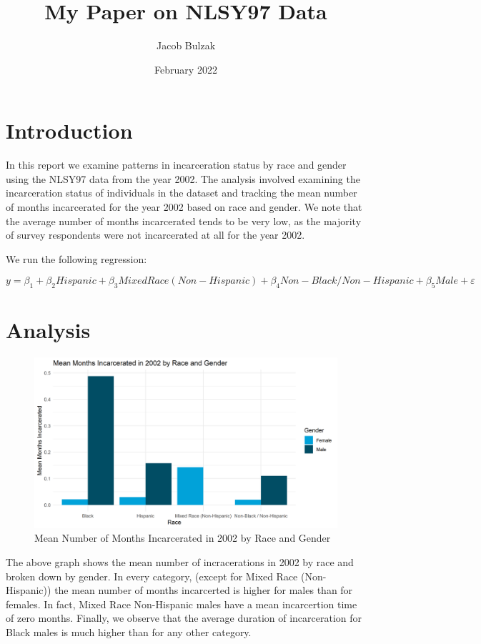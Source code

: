 \documentclass{article}
\author{Jacob Bulzak}
\title{My Paper on NLSY97 Data}
\date{February 2022}
\begin{document}
\maketitle

\section{Introduction}

In this report we examine patterns in incarceration status by race and gender using the NLSY97 data from the year 2002. The analysis involved examining the incarceration status of  individuals in the dataset and tracking the mean number of months incarcerated for the year 2002 based on race and gender. We note that the average number of months incarcerated tends to be very low, as the majority of survey respondents were not incarcerated at all for the year 2002.

We run the following regression:

\begin{equation*}
    y = \beta_1 + \beta_2 Hispanic + \beta_3 Mixed Race (Non-Hispanic)+ \beta_4 Non-Black / Non-Hispanic + \beta_5 Male + \varepsilon
\end{equation*}

\section{Analysis}


\begin{figure}[H]
    \begin{center}
        \includegraphics[width=.85\textwidth]{arrests_by_racegender}
    \end{center}
    \caption{Mean Number of Months Incarcerated in 2002 by Race and Gender}
    \label{fig:graph}
\end{figure}

The above graph shows the mean number of incracerations in 2002 by race and broken down by gender. In every category, (except for Mixed Race (Non-Hispanic)) the mean number of months incarcerted is higher for males than for females. In fact, Mixed Race Non-Hispanic males have a mean incarcertion time of zero months. Finally, we observe that the average duration of incarceration for Black males is much higher than for any other category.
\end{document}
